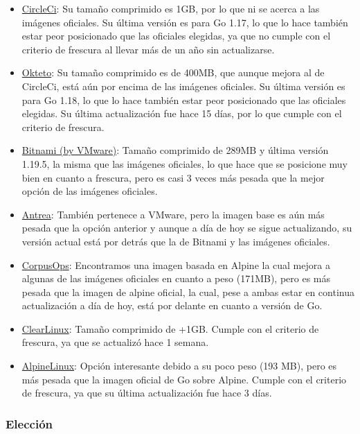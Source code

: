 \begin{itemize}
\item
  \href{https://hub.docker.com/r/circleci/golang}{CircleCi}: Su tamaño
  comprimido es 1GB, por lo que ni se acerca a las imágenes oficiales.
  Su última versión es para Go 1.17, lo que lo hace también estar peor
  posicionado que las oficiales elegidas, ya que no cumple con el
  criterio de frescura al llevar más de un año sin actualizarse.
\item
  \href{https://hub.docker.com/r/okteto/golang}{Okteto}: Su tamaño
  comprimido es de 400MB, que aunque mejora al de CircleCi, está aún por
  encima de las imágenes oficiales. Su última versión es para Go 1.18,
  lo que lo hace también estar peor posicionado que las oficiales
  elegidas. Su última actualización fue hace 15 días, por lo que cumple
  con el criterio de frescura.
\item
  \href{https://hub.docker.com/r/bitnami/golang}{Bitnami (by VMware)}:
  Tamaño comprimido de 289MB y última versión 1.19.5, la misma que las
  imágenes oficiales, lo que hace que se posicione muy bien en cuanto a
  frescura, pero es casi 3 veces más pesada que la mejor opción de las
  imágenes oficiales.
\item
  \href{https://hub.docker.com/r/antrea/golang}{Antrea}: También
  pertenece a VMware, pero la imagen base es aún más pesada que la
  opción anterior y aunque a día de hoy se sigue actualizando, su
  versión actual está por detrás que la de Bitnami y las imágenes
  oficiales.
\item
  \href{https://hub.docker.com/r/corpusops/golang}{CorpusOps}:
  Encontramos una imagen basada en Alpine la cual mejora a algunas de
  las imágenes oficiales en cuanto a peso (171MB), pero es más pesada
  que la imagen de alpine oficial, la cual, pese a ambas estar en
  continua actualización a día de hoy, está por delante en cuanto a
  versión de Go.
\item
  \href{https://hub.docker.com/r/clearlinux/golang}{ClearLinux}: Tamaño
  comprimido de +1GB. Cumple con el criterio de frescura, ya que se
  actualizó hace 1 semana.
\item
  \href{https://hub.docker.com/r/alpinelinux/golang}{AlpineLinux}:
  Opción interesante debido a su poco peso (193 MB), pero es más pesada
  que la imagen oficial de Go sobre Alpine. Cumple con el criterio de
  frescura, ya que su última actualización fue hace 3 días.
\end{itemize}

\subsubsection{Elección}

